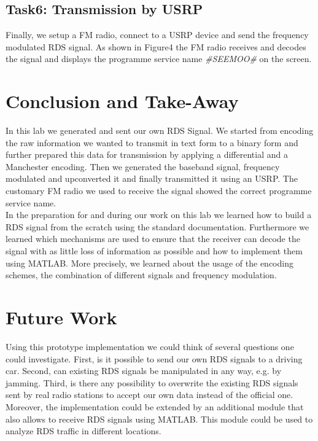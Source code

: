 \documentclass[sigconf]{acmart}
\begin{document}
\hypertarget{Task6:ux20Transmission by USRPux20}{%
\subsection{Task6: Transmission by USRP}
\label{Task6:ux20Transmission by USRPux20}}
Finally, we setup a FM radio, connect to a USRP device and send the frequency modulated RDS signal.
As shown in Figure4 the FM radio receives and decodes the signal and displays the programme service
name \textit{\#SEEMOO\#} on the screen.

\section{Conclusion and Take-Away}
In this lab we generated and sent our own RDS Signal. We started from encoding the raw information
we wanted to transmit in text form to a binary form and further prepared this data for transmission by
applying a differential and a Manchester encoding. Then we generated the baseband signal, frequency
modulated and upconverted it and finally transmitted it using an USRP. The customary FM radio we used
to receive the signal showed the correct programme service name.\\
In the preparation for and during our work on this lab we learned how to build a RDS signal from the scratch
using the standard documentation. Furthermore we learned which mechanisms are used to ensure that
the receiver can decode the signal with as little loss of information as possible and how to implement them
using MATLAB. More precisely, we learned about the usage of the encoding schemes, the combination of
different signals and frequency modulation.

\section{Future Work}
Using this prototype implementation we could think of several questions one could investigate. First, is it
possible to send our own RDS signals to a driving car. Second, can existing RDS signals be manipulated
in any way, e.g. by jamming. Third, is there any possibility to overwrite the existing RDS signals sent by
real radio stations to accept our own data instead of the official one.
Moreover, the implementation could be extended by an additional module that also allows to receive
RDS signals using MATLAB. This module could be used to analyze RDS traffic in different locations.




 
\end{document}
